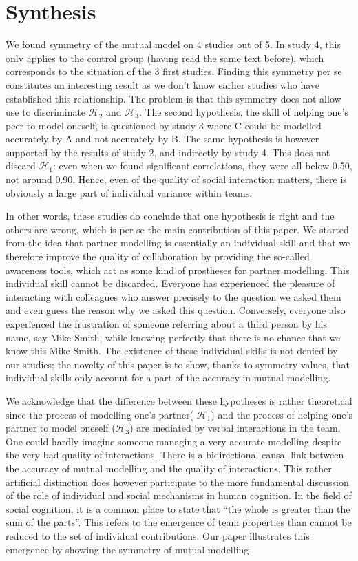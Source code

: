 \documentclass[natbib]{svjour3}
\newcommand{\A}{A\xspace}
\newcommand{\B}{B\xspace}
\newcommand{\C}{C\xspace}
\begin{document}
\section{Synthesis}

We found symmetry of the mutual model on 4 studies out of 5. In study 4, this
only applies to the control group (having read the same text before), which
corresponds to the situation of the 3 first studies.  Finding this symmetry per
se constitutes an interesting result as we don't know earlier studies who have
established this relationship. The problem is that this symmetry does not allow
use to discriminate  $\mathcal{H}_{2}$ and $\mathcal{H}_{3}$. The second
hypothesis, the skill of helping one's peer to model oneself, is questioned by
study 3 where \C could be modelled  accurately by \A and not accurately by \B. The
same hypothesis is however supported by the results of study 2, and indirectly
by study 4.  This does not discard $\mathcal{H}_{1}$: even when we found
significant correlations, they were all below 0.50, not around 0.90.  Hence,
even of the quality of social interaction matters, there is obviously a large
part of individual variance within teams.

In other words, these studies do conclude that one hypothesis is right and the
others are wrong, which is per se the main contribution of this paper. We
started from the idea that partner modelling is essentially an individual skill
and that we therefore improve the quality of collaboration by providing the
so-called awareness tools, which act as some kind of prostheses for partner
modelling. This individual skill cannot be discarded.  Everyone has experienced
the pleasure of interacting with colleagues who answer precisely to the question
we asked them  and even guess the reason why we asked this question. Conversely,
everyone also experienced the frustration of someone referring about a third
person by his name, say Mike Smith,  while knowing perfectly that there is no
chance that we know this Mike Smith. The existence of these individual skills is
not denied by our studies; the novelty of this paper is to show, thanks to
symmetry values, that individual skills only account  for a part of the accuracy
in mutual modelling. 


We acknowledge that the difference between these hypotheses is  rather
theoretical since the  process of modelling one's partner( $\mathcal{H}_{1}$)
and the process of helping one's partner to model oneself ($\mathcal{H}_{3}$) are
mediated by verbal interactions in the team. One could hardly imagine someone
managing a very accurate modelling despite the very bad quality of interactions.
There is a bidirectional causal link between the accuracy of mutual modelling
and the quality of interactions. This rather artificial distinction does however
participate to the more fundamental discussion of the role of individual and
social mechanisms in human cognition. In the field of social cognition, it is a
common place to state that ``the whole is greater than the sum of the parts''.
This refers to the emergence of team properties than cannot be reduced to the
set of individual contributions.  Our paper illustrates this emergence by
showing the symmetry of mutual modelling
\end{document}
